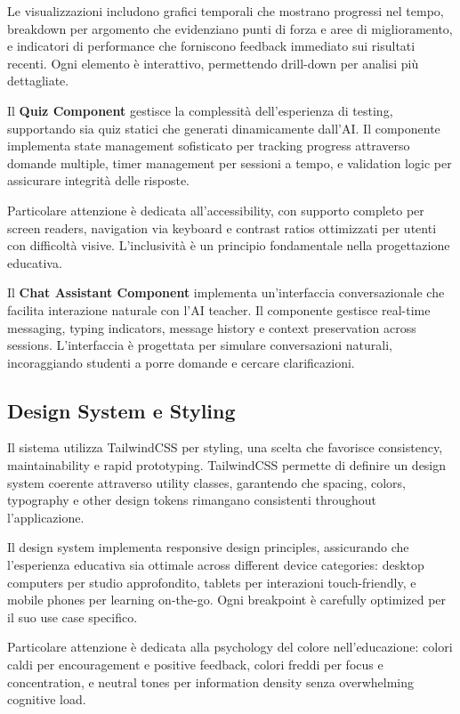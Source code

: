 \documentclass[12pt,a4paper]{article}
\begin{document}
Le visualizzazioni includono grafici temporali che mostrano progressi nel tempo, breakdown per argomento che evidenziano punti di forza e aree di miglioramento, e indicatori di performance che forniscono feedback immediato sui risultati recenti. Ogni elemento è interattivo, permettendo drill-down per analisi più dettagliate.

Il \textbf{Quiz Component} gestisce la complessità dell'esperienza di testing, supportando sia quiz statici che generati dinamicamente dall'AI. Il componente implementa state management sofisticato per tracking progress attraverso domande multiple, timer management per sessioni a tempo, e validation logic per assicurare integrità delle risposte.

Particolare attenzione è dedicata all'accessibility, con supporto completo per screen readers, navigation via keyboard e contrast ratios ottimizzati per utenti con difficoltà visive. L'inclusività è un principio fondamentale nella progettazione educativa.

Il \textbf{Chat Assistant Component} implementa un'interfaccia conversazionale che facilita interazione naturale con l'AI teacher. Il componente gestisce real-time messaging, typing indicators, message history e context preservation across sessions. L'interfaccia è progettata per simulare conversazioni naturali, incoraggiando studenti a porre domande e cercare clarificazioni.

\subsection{Design System e Styling}

Il sistema utilizza TailwindCSS per styling, una scelta che favorisce consistency, maintainability e rapid prototyping. TailwindCSS permette di definire un design system coerente attraverso utility classes, garantendo che spacing, colors, typography e other design tokens rimangano consistenti throughout l'applicazione.

Il design system implementa responsive design principles, assicurando che l'esperienza educativa sia ottimale across different device categories: desktop computers per studio approfondito, tablets per interazioni touch-friendly, e mobile phones per learning on-the-go. Ogni breakpoint è carefully optimized per il suo use case specifico.

Particolare attenzione è dedicata alla psychology del colore nell'educazione: colori caldi per encouragement e positive feedback, colori freddi per focus e concentration, e neutral tones per information density senza overwhelming cognitive load.
\end{document}
